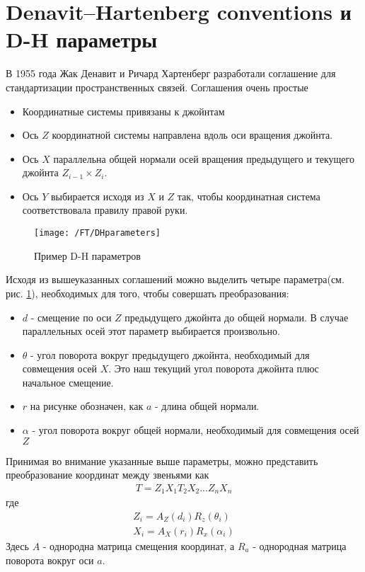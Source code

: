 \section{Denavit–Hartenberg conventions и D-H параметры}\label{sect2_3}
В 1955 года Жак Денавит и Ричард Хартенберг разработали соглашение для стандартизации пространственных связей\cite{DenavitHartenberg}. Соглашения очень простые
\begin{itemize}
	\item Координатные системы привязаны к джойнтам
	\item Ось $Z$ координатной системы направлена вдоль оси вращения джойнта.
	\item Ось $X$ параллельна общей нормали осей вращения предыдущего и текущего джойнта $Z_{i-1} \times Z_{i}$.
	\item Ось $Y$ выбирается исходя из $X$ и $Z$ так, чтобы координатная система соответствовала правилу правой руки.
\end{itemize}
\begin{figure}[h!]
	\centering
	\texttt{[image: /FT/DHparameters]}
	\caption{Пример D-H параметров}
	\label{fig:2_3_1}
\end{figure}
Исходя из вышеуказанных соглашений можно выделить четыре параметра(см. рис. \ref{fig:2_3_1}), необходимых для того, чтобы совершать преобразования:
\begin{itemize}
	\item $d$ - смещение по оси $Z$ предыдущего джойнта до общей нормали. В случае параллельных осей этот параметр выбирается произвольно.
	\item $\theta$ - угол поворота вокруг предыдущего джойнта, необходимый для совмещения осей $X$. Это наш текущий угол поворота джойнта плюс начальное смещение.
	\item $r$ на рисунке обозначен, как $a$ - длина общей нормали.
	\item $\alpha$ - угол поворота вокруг общей нормали, необходимый для совмещения осей $Z$
\end{itemize}
Принимая во внимание указанные выше параметры, можно представить преобразование координат между звеньями как
\begin{align*}
	T = Z_{1}X_{1}T_{2}X_{2} ... Z_{n}X_{n}
\end{align*}
где
\begin{equation}\label{eq:2_3_1}
	\begin{aligned}
		Z_{i} = A_{Z}(d_{i})R_{z}(\theta_{i})\\
		X_{i} = A_{X}(r_{i})R_{x}(\alpha_{i})
	\end{aligned}
\end{equation}
Здесь $A$ - однородна матрица смещения координат, а $R_{a}$ - однородная матрица поворота вокруг оси $a$.

